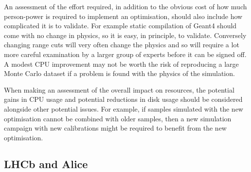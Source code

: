 \documentclass[12pt,a4paper]{article}
\begin{document}
{An assessment of the effort required, in addition to the obvious cost of
how much person-power is required to implement an optimisation, should
also include how complicated it is to validate. For example static
compilation of Geant4 should come with no change in physics, so it is
easy, in principle, to validate. Conversely changing range cuts will
very often change the physics and so will require a lot more careful
examination by a larger group of experts before it can be signed off. A
modest CPU improvement may not be worth the risk of reproducing a large
Monte Carlo dataset if a problem is found with the physics of the
simulation.

When making an assessment of the overall impact on resources, the
potential gains in CPU usage and potential reductions in disk usage
should be considered alongside other potential issues. For example, if
samples simulated with the new optimisation cannot be combined with
older samples, then a new simulation campaign with new calibrations
might be required to benefit from the new optimisation.

\hypertarget{lhcb-and-alice}{%
\subsection{LHCb and Alice}\label{lhcb-and-alice}}

}
\end{document}
